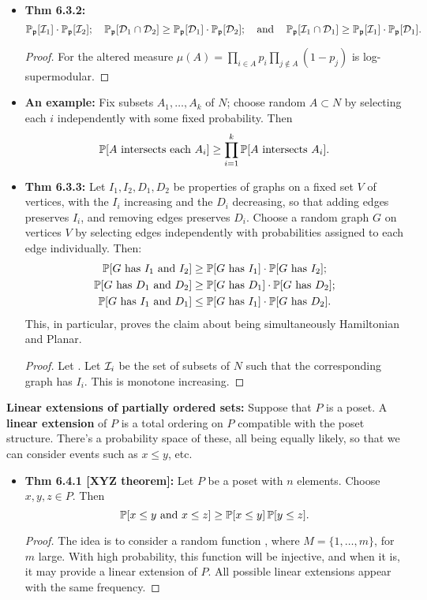 \documentclass[11pt]{article}
\newenvironment{INT}[1][]{\begin{itemize}\small\item\textbf{#1}}{\end{itemize}}
\newcommand{\moreINT}[1][]{\item\textbf{#1}}
\begin{document}
\begin{chapter6}
\begin{itemise}
\begin{INT}[Thm 6.3.2:]
\[\operatorname{\mathbb{P}}_{\mathfrak{p}}[\mathcal{I}_1]\cdot\operatorname{\mathbb{P}}_{\mathfrak{p}}[\mathcal{I}_2];\quad \operatorname{\mathbb{P}}_{\mathfrak{p}}[\mathcal{D}_1\cap\mathcal{D}_2]\geq
\operatorname{\mathbb{P}}_{\mathfrak{p}}[\mathcal{D}_1]\cdot\operatorname{\mathbb{P}}_{\mathfrak{p}}[\mathcal{D}_2];\quad\textup{and}\quad  \operatorname{\mathbb{P}}_{\mathfrak{p}}[\mathcal{I}_1\cap\mathcal{D}_1]\geq
\operatorname{\mathbb{P}}_{\mathfrak{p}}[\mathcal{I}_1]\cdot\operatorname{\mathbb{P}}_{\mathfrak{p}}[\mathcal{D}_1].\]
\begin{proof}
For the altered measure $\mu(A)=\prod_{i\in A}p_i\prod_{j\notin A}(1-p_j)$ is log-supermodular.
\end{proof}
\moreINT[An example:] Fix subsets $A_1,\ldots,A_k$ of $N$; choose random $A\subset N$ by selecting each $i$ independently with some fixed probability. Then
\[\operatorname{\mathbb{P}}[A\textup{ intersects each }A_i]\geq\prod_{i=1}^k\operatorname{\mathbb{P}}[A\textup{ intersects }A_i].\]
\moreINT[Thm 6.3.3:] Let $I_1,I_2,D_1,D_2$ be properties of graphs on a fixed set $V$ of vertices, with the $I_i$ increasing and the $D_i$ decreasing, so that adding edges preserves $I_i$, and removing edges preserves $D_i$. Choose a random graph $G$ on vertices $V$ by selecting edges independently with probabilities assigned to each edge individually. Then:
\begin{alignat*}{2}
\operatorname{\mathbb{P}}[G\textup{ has $I_1$ and $I_2$}]&\geq\operatorname{\mathbb{P}}[G\textup{ has $I_1$}]\cdot\operatorname{\mathbb{P}}[G\textup{ has $I_2$}];\\
\operatorname{\mathbb{P}}[G\textup{ has $D_1$ and $D_2$}]&\geq\operatorname{\mathbb{P}}[G\textup{ has $D_1$}]\cdot\operatorname{\mathbb{P}}[G\textup{ has $D_2$}];\\
\operatorname{\mathbb{P}}[G\textup{ has $I_1$ and $D_1$}]&\leq\operatorname{\mathbb{P}}[G\textup{ has $I_1$}]\cdot\operatorname{\mathbb{P}}[G\textup{ has $D_2$}].
\end{alignat*}
This, in particular, proves the claim about being simultaneously Hamiltonian and Planar.
\begin{proof}
Let . Let $\mathcal{I}_i$ be the set of subsets of $N$ such that the corresponding graph has $I_i$. This is monotone increasing.
\end{proof}
\end{INT}
\item \textbf{Linear extensions of partially ordered sets:} Suppose that $P$ is a poset. A \textbf{linear extension} of $P$ is a total ordering on $P$ compatible with the poset structure. There's a probability space of these, all being equally likely, so that we can consider events such as $x\leq y$, etc.
\begin{INT}[Thm 6.4.1 {[XYZ theorem]}:]
Let $P$ be a poset with $n$ elements. Choose $x,y,z\in P$. Then
\[\operatorname{\mathbb{P}}[x\leq y\textup{ and } x\leq z]\geq\operatorname{\mathbb{P}}[x\leq y]\operatorname{\mathbb{P}}[y\leq z].\]
\begin{proof}
The idea is to consider a random function , where $M=\{1,\ldots,m\}$, for $m$ large. With high probability, this function will be injective, and when it is, it may provide a linear extension of $P$. All possible linear extensions appear with the same frequency.


\end{proof}
\end{INT}
\end{itemise}
\end{chapter6}
\end{document}
